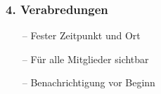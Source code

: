 \documentclass[aspectratio=1610]{beamer}
\begin{document}
\begin{frame}[plain]
\frametitle{4. Verabredungen}
\begin{minipage}{0.5\textwidth}
	\setlength{\fboxsep}{0pt}%
	\setlength{\fboxrule}{1pt}%
	\captionsetup{labelformat=empty}
	\centering
\end{minipage}%
\begin{minipage}{0.5\textwidth}
	\begin{itemize}
		\setlength\itemsep{0.3em}
		\item[--] Fester Zeitpunkt und Ort
		\item[--] Für alle Mitglieder sichtbar
		\item[--] Benachrichtigung vor Beginn
	\end{itemize}
\end{minipage}
\end{frame}
\end{document}
